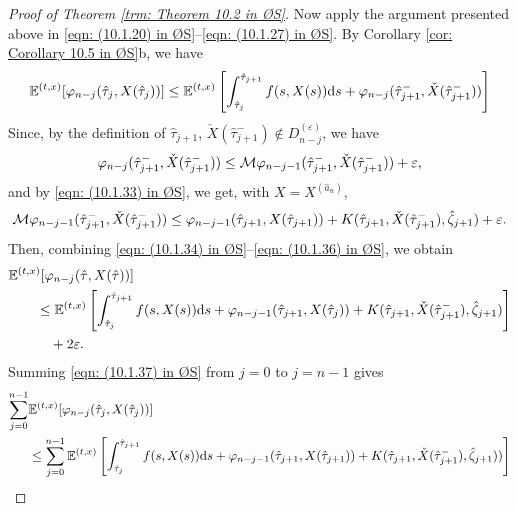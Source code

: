 \begin{proof}[Proof of Theorem \ref{trm: Theorem 10.2 in ØS}]
    Now apply the argument presented above in \eqref{eqn: (10.1.20) in ØS}--\eqref{eqn: (10.1.27) in ØS}. By Corollary \ref{cor: Corollary 10.5 in ØS}b, we have
    \begin{equation}
        \mathbb{E}^{(t,x)} [\varphi_{n-j}(\hat{\tau}_j, X(\hat{\tau}_j))] \leq \mathbb{E}^{(t,x)} \left[ \int_{\hat{\tau}_j}^{\hat{\tau}_{j+1}}f(s,X(s)) \mathrm{d} s + \varphi_{n-j}(\hat{\tau}_{j+1}^-, \check{X}(\hat{\tau}_{j+1}^-)) \right]
        \label{eqn: (10.1.34) in ØS}
    \end{equation}
    Since, by the definition of $\hat{\tau}_{j+1}$, $\check{X}(\hat{\tau}_{j+1}^-) \notin D^{(\varepsilon)}_{n-j}$, we have
    \begin{equation}
        \varphi_{n-j}(\hat{\tau}_{j+1}^-, \check{X}(\hat{\tau}_{j+1}^-)) \leq \mathcal{M} \varphi_{n-j-1}(\hat{\tau}_{j+1}^-, \check{X}(\hat{\tau}_{j+1}^-)) + \varepsilon,
        \label{eqn: (10.1.35) in ØS}
    \end{equation}
    and by \eqref{eqn: (10.1.33) in ØS}, we get, with $X=X^{(\hat{a}_n)}$,
    \begin{equation}
        \mathcal{M} \varphi_{n-j-1}(\hat{\tau}_{j+1}^-,\check{X}(\hat{\tau}_{j+1}^-)) \leq \varphi_{n-j-1}(\hat{\tau}_{j+1}, X(\hat{\tau}_{j+1})) + K(\hat{\tau}_{j+1},\check{X}(\hat{\tau}_{j+1}^-), \hat{\zeta}_{j+1}) + \varepsilon.
        \label{eqn: (10.1.36) in ØS}
    \end{equation}
    Then, combining \eqref{eqn: (10.1.34) in ØS}--\eqref{eqn: (10.1.36) in ØS}, we obtain
    \begin{align}
        &\mathbb{E}^{(t,x)} [\varphi_{n-j}(\hat{\tau}, X(\hat{\tau}))] \nonumber \\
        & \qquad \leq \mathbb{E}^{(t,x)} \left[ \int_{\hat{\tau}_{j}}^{\hat{\tau}_{j+1}} f(s,X(s)) \mathrm{d} s + \varphi_{n-j-1}(\hat{\tau}_{j+1}, X(\hat{\tau}_{j})) + K(\hat{\tau}_{j+1},\check{X}(\hat{\tau}_{j+1}^-), \hat{\zeta}_{j+1}) \right] \nonumber\\
        & \qquad \quad+ 2 \varepsilon. 
        \label{eqn: (10.1.37) in ØS}
    \end{align}
    Summing \eqref{eqn: (10.1.37) in ØS} from $j=0$ to $j=n-1$ gives
    \begin{align}
        \sum_{j=0}^{n-1} &\Etx[\varphi_{n-j}(\hat{\tau}_j, X(\hat{\tau}_j))] \nonumber \\
        &\leq \sum_{j=0}^{n-1} \Etx \left[ \int_{\hat{\tau}_j}^{\hat{\tau}_{j+1}}f(s,X(s)) \diff s + \varphi_{n-j-1}(\hat{\tau}_{j+1}, X(\hat{\tau}_{j+1})) + K(\hat{\tau}_{j+1},\check{X}(\hat{\tau}_{j+1}^-), \hat{\zeta}_{j+1})) \right] \nonumber \\

\end{align}
\end{proof}
